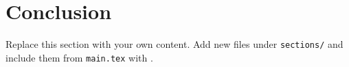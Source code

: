 \section{Conclusion}
\label{sec:conclusion}

Replace this section with your own content. Add new files under
\texttt{sections/} and include them from \texttt{main.tex} with
\verb||.
